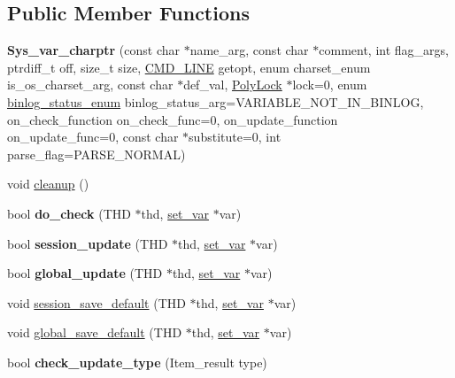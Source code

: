 \subsection*{Public Member Functions}
\begin{DoxyCompactItemize}
\item 
\mbox{\label{classSys__var__charptr_a2af964e41e4d928c7cd4f02618a1ebef}} 
{\bfseries Sys\+\_\+var\+\_\+charptr} (const char $\ast$name\+\_\+arg, const char $\ast$comment, int flag\+\_\+args, ptrdiff\+\_\+t off, size\+\_\+t size, \mbox{\hyperlink{structCMD__LINE}{C\+M\+D\+\_\+\+L\+I\+NE}} getopt, enum charset\+\_\+enum is\+\_\+os\+\_\+charset\+\_\+arg, const char $\ast$def\+\_\+val, \mbox{\hyperlink{classPolyLock}{Poly\+Lock}} $\ast$lock=0, enum \mbox{\hyperlink{classsys__var_a664520ec82191888717c86085bfa83ce}{binlog\+\_\+status\+\_\+enum}} binlog\+\_\+status\+\_\+arg=V\+A\+R\+I\+A\+B\+L\+E\+\_\+\+N\+O\+T\+\_\+\+I\+N\+\_\+\+B\+I\+N\+L\+OG, on\+\_\+check\+\_\+function on\+\_\+check\+\_\+func=0, on\+\_\+update\+\_\+function on\+\_\+update\+\_\+func=0, const char $\ast$substitute=0, int parse\+\_\+flag=P\+A\+R\+S\+E\+\_\+\+N\+O\+R\+M\+AL)
\item 
void \mbox{\hyperlink{classSys__var__charptr_a7cb7fcaf1b60752b38bfcff61e92b2ca}{cleanup}} ()
\item 
\mbox{\label{classSys__var__charptr_a34295c6a6215579f387bbe79b00a815e}} 
bool {\bfseries do\+\_\+check} (T\+HD $\ast$thd, \mbox{\hyperlink{classset__var}{set\+\_\+var}} $\ast$var)
\item 
\mbox{\label{classSys__var__charptr_a82e0116ef328a7bb5b48380fb1d999c8}} 
bool {\bfseries session\+\_\+update} (T\+HD $\ast$thd, \mbox{\hyperlink{classset__var}{set\+\_\+var}} $\ast$var)
\item 
\mbox{\label{classSys__var__charptr_ae0b9cdb632396e071f9da101d97b0070}} 
bool {\bfseries global\+\_\+update} (T\+HD $\ast$thd, \mbox{\hyperlink{classset__var}{set\+\_\+var}} $\ast$var)
\item 
void \mbox{\hyperlink{classSys__var__charptr_a37d10016ddc7bbe7443be35afd3bb823}{session\+\_\+save\+\_\+default}} (T\+HD $\ast$thd, \mbox{\hyperlink{classset__var}{set\+\_\+var}} $\ast$var)
\item 
void \mbox{\hyperlink{classSys__var__charptr_a9f0eb7d9ac367d2652c5aefe05282dae}{global\+\_\+save\+\_\+default}} (T\+HD $\ast$thd, \mbox{\hyperlink{classset__var}{set\+\_\+var}} $\ast$var)
\item 
\mbox{\label{classSys__var__charptr_a8950d2a56abc909cf4bcc04d35cc490d}} 
bool {\bfseries check\+\_\+update\+\_\+type} (Item\+\_\+result type)
\end{DoxyCompactItemize}

